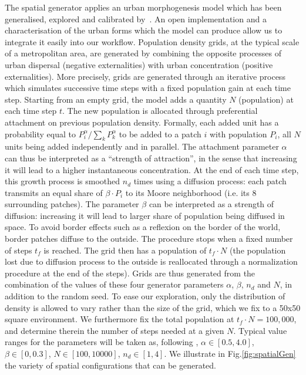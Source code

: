 \documentclass{JASSS}
\begin{document}
The spatial generator applies an urban morphogenesis model \citep{batty2007cities} which has been generalised, explored and calibrated by~\citet{raimbault2018calibration}. An open implementation and a characterisation of the urban forms which the model can produce allow us to integrate it easily into our workflow. Population density grids, at the typical scale of a metropolitan area, are generated by combining the opposite processes of urban dispersal (negative externalities) with urban concentration (positive externalities). More precisely, grids are generated through an iterative process which simulates successive time steps with a fixed population gain at each time step. Starting from an empty grid, the model adds a quantity $N$ (population) at each time step $t$. The new population is allocated through preferential attachment on previous population density. Formally, each added unit has a probability equal to $P_i^{\alpha}/\sum_k P_k^{\alpha}$ to be added to a patch $i$ with population $P_i$, all $N$ units being added independently and in parallel. The attachment parameter $\alpha$ can thus be interpreted as a ``strength of attraction'', in the sense that increasing it will lead to a higher instantaneous concentration. At the end of each time step, this growth process is smoothed $n_d$ times using a diffusion process: each patch transmits an equal share of $\beta\cdot P_i$ to its Moore neighborhood (i.e. its 8 surrounding patches). The parameter $\beta$ can be interpreted as a strength of diffusion: increasing it will lead to larger share of population being diffused in space. To avoid border effects such as a reflexion on the border of the world, border patches diffuse to the outside. The procedure stops when a fixed number of steps $t_f$ is reached. The grid then has a population of $t_f \cdot N$ (the population lost due to diffusion process to the outside is reallocated through a normalization procedure at the end of the steps). Grids are thus generated from the combination of the values of these four generator parameters $\alpha$, $\beta$, $n_d$ and $N$, in addition to the random seed. To ease our exploration, only the distribution of density is allowed to vary rather than the size of the grid, which we fix to a 50x50 square environment. We furthermore fix the total population at $t_f\cdot N = 100,000$, and determine therein the number of steps needed at a given $N$. Typical value ranges for the  parameters will be taken as, following \citet{raimbault2018calibration}, $\alpha\in\left[0.5,4.0\right]$, $\beta \in\left[0,0.3\right] $, $N\in \left[100,10000\right]$, $n_d\in\left[1,4\right]$. We illustrate in Fig.\ref{fig:spatialGen} the variety of spatial configurations that can be generated.
\end{document}
